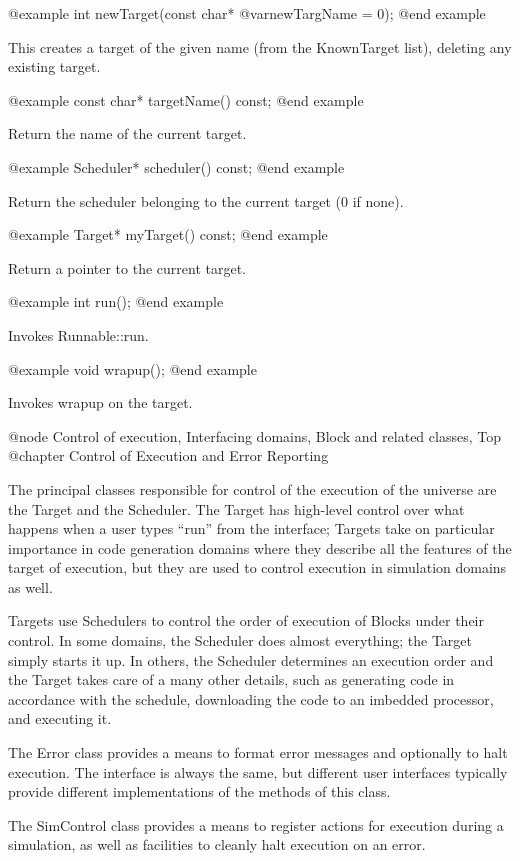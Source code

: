 @example
int newTarget(const char* @var{newTargName} = 0);
@end example

This creates a target of the given name (from the KnownTarget list),
deleting any existing target.

@example
const char* targetName() const;
@end example

Return the name of the current target.

@example
Scheduler* scheduler() const;
@end example

Return the scheduler belonging to the current target (0 if none).

@example
Target* myTarget() const;
@end example

Return a pointer to the current target.

@example
int run();
@end example

Invokes Runnable::run.

@example
void wrapup();
@end example

Invokes wrapup on the target.

@node Control of execution, Interfacing domains, Block and related classes, Top
@chapter Control of Execution and Error Reporting

The principal classes responsible for control of the execution of the
universe are the Target and the Scheduler.  The Target has high-level
control over what happens when a user types ``run'' from the interface;
Targets take on particular importance in code generation domains where
they describe all the features of the target of execution, but they
are used to control execution in simulation domains as well.

Targets use Schedulers to control the order of execution of Blocks under
their control.  In some domains, the Scheduler does almost everything;
the Target simply starts it up.  In others, the Scheduler determines
an execution order and the Target takes care of a many other
details, such as generating code in accordance with the schedule,
downloading the code to an imbedded processor, and executing it.

The Error class provides a means to format error messages and optionally
to halt execution.  The interface is always the same, but different
user interfaces typically provide different implementations of the
methods of this class.

The SimControl class provides a means to register actions for execution
during a simulation, as well as facilities to cleanly halt execution
on an error.

